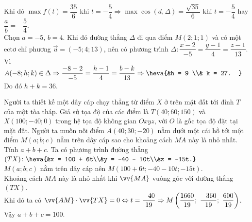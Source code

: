 \begin{ex}
{\begin{center}
        \end{center}
        Khi đó $\max f(t) = \dfrac{35}{6}$ khi $t = -\dfrac{5}{4} \Rightarrow \max \cos (d, \Delta) = \dfrac{\sqrt{35}}{6}$ khi $t = -\dfrac{5}{4}$ hay $\dfrac{a}{b} = -\dfrac{5}{4}$.\\
        Chọn $a = -5$, $b = 4$. Khi đó đường thẳng $\Delta$ đi qua điểm $M(2;1;1)$ và có một ectơ chỉ phương $\overrightarrow{u} = (-5; 4; 13)$, nên có phương trình $\Delta\colon \dfrac{x - 2}{-5} = \dfrac{y - 1}{4} = \dfrac{z - 1}{13}$.\\
        Vì $A(-8; h; k) \in \Delta \Rightarrow \dfrac{-8 - 2}{-5} = \dfrac{h - 1}{4} = \dfrac{b - k}{13} \Rightarrow \heva{&h = 9 \\& k = 27. }$\\
        Do đó $h + k = 36$.
    }
\end{ex}
\begin{ex}%
    Người ta thiết kế một dây cáp chạy thẳng từ điểm $X$ ở trên mặt đất tới đỉnh $T$ của một tòa tháp. Giả sử tọa độ của các điểm là $T(40;60;150)$ và $X(100;-40;0)$ trong hệ tọa độ không gian $Oxyz$, với $O$ là gốc tọa độ đặt tại mặt đất. Người ta muốn nối điểm $A(40;30;-20)$ nằm dưới một cái hồ tới một điểm $M(a;b;c)$ nằm trên dây cáp  sao cho khoảng cách $MA$ này là nhỏ nhất. Tính $a+b+c$.
    \loigiai
    {
        Ta có phương trình đường thẳng $(TX)\colon\heva{&x = 100 + 6t\\&y = -40 - 10t\\&z = -15t.}$\\
        $M(a; b; c)$ nằm trên dây cáp nên $M(100 + 6t; -40 - 10t; -15t)$.\\
        Khoảng cách $MA$ này là nhỏ nhất khi $\vv{MA}$ vuông góc với đường thẳng $(TX)$.\\
        Khi đó ta có $\vv{AM} \cdot \vv{TX} = 0 \Leftrightarrow t = \dfrac{-40}{19} \Rightarrow M\left( \dfrac{1660}{19};\ \dfrac{-360}{19};\ \dfrac{600}{19} \right)$.\\
        Vậy $a + b + c = 100$.
    }
\end{ex}

